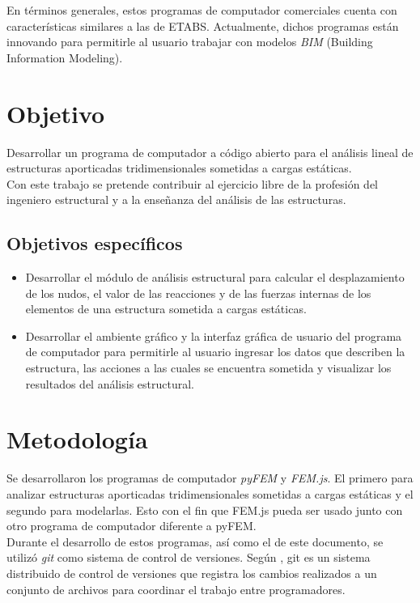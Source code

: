 En términos generales, estos programas de computador comerciales cuenta con características similares a las de ETABS. Actualmente, dichos programas están innovando para permitirle al usuario trabajar con modelos \emph{BIM} (Building Information Modeling).\\

\section{Objetivo}

Desarrollar un programa de computador a código abierto para el análisis lineal de estructuras aporticadas tridimensionales sometidas a cargas estáticas.\\

Con este trabajo se pretende contribuir al ejercicio libre de la profesión del ingeniero estructural y a la enseñanza del análisis de las estructuras.
\subsection{Objetivos específicos}

\begin{itemize}
\item Desarrollar el módulo de análisis estructural para calcular el desplazamiento de los nudos, el valor de las reacciones y de las fuerzas internas de los elementos de una estructura sometida a cargas estáticas.
\item Desarrollar el ambiente gráfico y la interfaz gráfica de usuario del programa de computador para permitirle al usuario ingresar los datos que describen la estructura, las acciones a las cuales se encuentra sometida y visualizar los resultados del análisis estructural.
\end{itemize}

\section{Metodología}

Se desarrollaron los programas de computador \emph{pyFEM} y \emph{FEM.js}. El primero para analizar estructuras aporticadas tridimensionales sometidas a cargas estáticas y el segundo para modelarlas. Esto con el fin que FEM.js pueda ser usado junto con otro programa de computador diferente a pyFEM.\\

Durante el desarrollo de estos programas, así como el de este documento, se utilizó \emph{git} como sistema de control de versiones. Según \cite{chacon2014git}, git es un sistema distribuido de control de versiones que registra los cambios realizados a un conjunto de archivos para coordinar el trabajo entre programadores.\\

